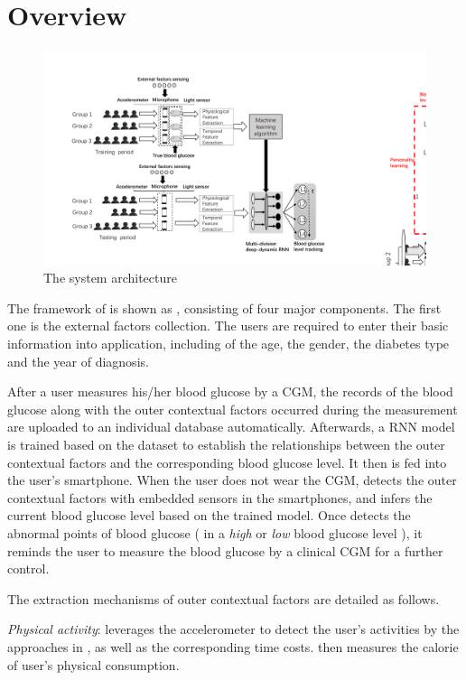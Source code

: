 
\section{Overview}
\label{sec:overview}

\begin{figure}[!t]
  \centering
  \includegraphics[width=1\columnwidth]{./img/System_Arch.pdf}
  \caption{The system architecture}
  \label{fig:architecture}
\end{figure}

The framework of \sysname is shown as , consisting of four major components. 
The first one is the external factors collection.  
The users are required to enter their basic information into application, including of the age, the gender, the diabetes type and the year of diagnosis.

After a user measures his/her blood glucose by a CGM, the records of the blood glucose along with the outer contextual factors occurred during the measurement are uploaded to an individual database automatically. 
Afterwards, a RNN model is trained based on the dataset to establish the relationships between the outer contextual factors and the corresponding blood glucose level. 
It then is fed into the user's smartphone. 
When the user does not wear the CGM, \sysname detects the outer contextual factors with embedded sensors in the smartphones, and infers the current blood glucose level based on the trained model.  
Once \sysname detects the abnormal points of blood glucose ( \ie in a \emph{high} or \emph{low} blood glucose level ), it reminds the user to measure the blood glucose by a clinical CGM for a further control.

The extraction mechanisms of outer contextual factors are detailed as follows.

\emph{Physical activity}: 
\sysname leverages the accelerometer to detect the user's activities by the approaches in \cite{bayat2014study}, as well as the corresponding time costs. 
\sysname then measures the calorie of user's physical consumption.

